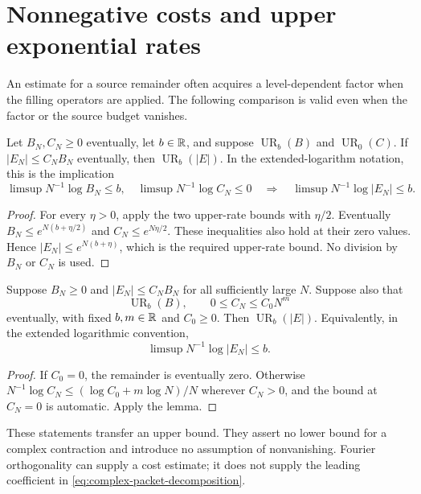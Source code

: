 \section{Nonnegative costs and upper exponential rates}

An estimate for a source remainder often acquires a level-dependent
factor when the filling operators are applied. The following
comparison is valid even when the factor or the source budget
vanishes.

\begin{lemma}
\label{lem:subexponential-remainder-transfer}
Let $B_N,C_N\ge0$ eventually, let $b\in\mathbb R$, and suppose
$\operatorname{UR}_b(B)$ and $\operatorname{UR}_0(C)$.
If $|E_N|\le C_NB_N$ eventually, then $\operatorname{UR}_b(|E|)$.
In the extended-logarithm notation, this is the implication
\[
 \limsup N^{-1}\log B_N\le b,\quad
 \limsup N^{-1}\log C_N\le0
 \quad\Longrightarrow\quad
 \limsup N^{-1}\log|E_N|\le b.
\]
\end{lemma}

\begin{proof}
For every $\eta>0$, apply the two upper-rate bounds with
$\eta/2$. Eventually
$B_N\le e^{N(b+\eta/2)}$ and $C_N\le e^{N\eta/2}$.
These inequalities also hold at their zero values. Hence
$|E_N|\le e^{N(b+\eta)}$, which is the required upper-rate
bound. No division by $B_N$
or $C_N$ is used.
\end{proof}

\begin{corollary}
\label{cor:polynomial-remainder-transfer}
Suppose $B_N\ge0$ and $|E_N|\le C_NB_N$ for all sufficiently
large $N$. Suppose also that
\[
 \operatorname{UR}_b(B),\qquad
 0\le C_N\le C_0N^m
\]
eventually, with fixed $b,m\in\mathbb R$ and $C_0\ge0$.
Then $\operatorname{UR}_b(|E|)$. Equivalently, in the extended
logarithmic convention,
\[
                 \limsup N^{-1}\log|E_N|\le b.
\]
\end{corollary}
\begin{proof}
If $C_0=0$, the remainder is eventually zero. Otherwise
$N^{-1}\log C_N\le(\log C_0+m\log N)/N$ wherever $C_N>0$,
and the bound at $C_N=0$ is automatic. Apply the lemma.
\end{proof}

These statements transfer an upper bound. They assert no lower
bound for a complex contraction and introduce no assumption of
nonvanishing. Fourier orthogonality can supply a cost estimate;
it does not supply the leading coefficient in
\eqref{eq:complex-packet-decomposition}.

